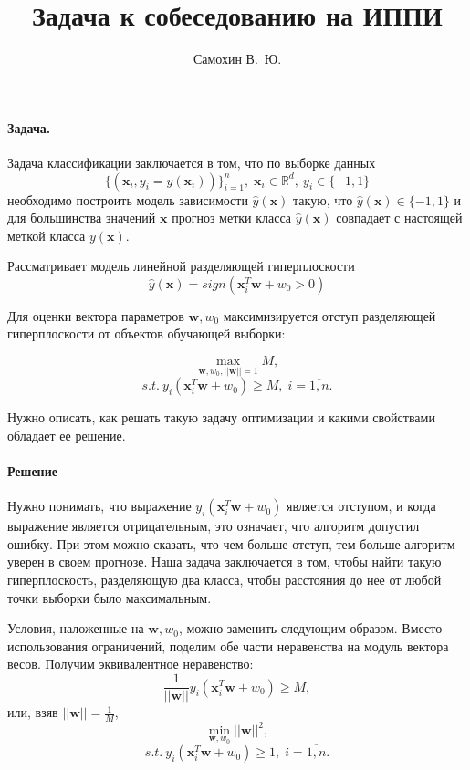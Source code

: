 \documentclass[12pt]{article}
\title{Задача к собеседованию на ИППИ}
\author{Самохин В.~Ю.}
\renewcommand{\geq}{\ensuremath{\geqslant}}
\begin{document}
	\maketitle
	\paragraph{Задача. }
	Задача классификации заключается в том, что по выборке данных $$\{(\mathbf{x}_i, y_i = y(\mathbf{x}_i))\}_{i=1}^{n}, \; \mathbf{x}_i \in \mathbb{R}^d,\ y_i \in \{-1,1\}$$
	необходимо построить модель зависимости $\hat{y}(\mathbf{x})$ такую, что $\hat{y}(\mathbf{x}) \in \{-1,1\}$ и для большинства значений $\mathbf{x}$ прогноз метки класса $\hat{y}(\mathbf{x})$ совпадает с настоящей меткой класса $y(\mathbf{x})$.
	
	Рассматривает модель линейной разделяющей гиперплоскости $$\hat{y}(\mathbf{x}) = sign(\mathbf{x}_i^T\mathbf{w} + w_0 > 0)$$
	
	Для оценки вектора параметров $\mathbf{w}, w_0$ максимизируется отступ разделяющей гиперплоскости от объектов обучающей выборки:
	
	$$\underset{\mathbf{w}, w_0, ||\mathbf{w}|| = 1}{\max}M,$$
	$$s.t. \ y_i(\mathbf{x}_i^T\mathbf{w} + w_0) \geq M, \; i = \overline{1,n}.$$
	
	Нужно описать, как решать такую задачу оптимизации и какими свойствами обладает ее решение.
	
	\paragraph{Решение}
	
	Нужно понимать, что выражение $y_i(\mathbf{x}_i^T\mathbf{w} + w_0)$ является отступом, и когда выражение является отрицательным, это означает, что алгоритм допустил ошибку. При этом можно сказать, что чем больше отступ, тем больше алгоритм уверен в своем прогнозе.
	Наша задача заключается в том, чтобы найти такую гиперплоскость, разделяющую два класса, чтобы расстояния до нее от любой точки выборки было максимальным.
	
	Условия, наложенные на $\mathbf{w}, w_0$, можно заменить следующим образом. Вместо использования ограничений, поделим обе части неравенства на модуль вектора весов.
	Получим эквивалентное неравенство:
	$$\dfrac{1}{||\mathbf{w}||} y_i(\mathbf{x}_i^T\mathbf{w} + w_0) \geq M,$$
	или, взяв $||\mathbf{w}|| = \frac{1}{M}$,
		$$\underset{\mathbf{w}, w_0}{\min} ||\mathbf{w}||^2,$$
	$$s.t. \ y_i(\mathbf{x}_i^T\mathbf{w} + w_0) \geq 1, \; i = \overline{1,n}.$$
	
\end{document}
